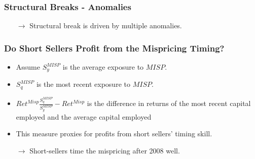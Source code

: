 \documentclass{beamer}
\begin{document}


\begin{frame}[label=break_anomalies]
\frametitle{Structural Breaks - Anomalies}
\vspace*{-1cm}
\begin{table}[htbp]
  \centering
  \footnotesize
  	  \resizebox{\textwidth}{!}{	 	
	 	
	\label{tab:break_anomalies}%
	}
\end{table}
\begin{itemize}
\item[$\rightarrow$] Structural break is driven by multiple anomalies.
\end{itemize}
\hfill \hyperlink{aum_spread_correlate}{}
	\end{frame}


\begin{frame}
\frametitle{Do Short Sellers Profit from the Mispricing Timing?}

\begin{itemize}
\item Assume $S^{MISP}_y$ is the average exposure to $MISP$.
\item $S^{MISP}_q$ is the most recent exposure to $MISP$.
\item  $Ret^{Misp}\frac{S^{MISP}_q}{S^{MISP}_y} - Ret^{Misp} $ is the difference in returns of the most recent capital employed and the average capital employed
\item This measure proxies for profits from short sellers' timing skill.
\end{itemize}

\begin{table}[htbp]
  \centering
  \footnotesize
  	  \resizebox{0.65\textwidth}{!}{	 	
	 	
	\label{tab:misp_timing}%
	}
\end{table}
\begin{itemize}
\item[$\rightarrow$] Short-sellers time the mispricing after 2008 well.
\end{itemize}
	\end{frame}
\end{document}
